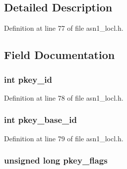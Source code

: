 \subsection{Detailed Description}


Definition at line 77 of file asn1\+\_\+locl.\+h.



\subsection{Field Documentation}
\subsubsection[{\texorpdfstring{pkey\+\_\+id}{pkey_id}}]{\setlength{\rightskip}{0pt plus 5cm}int pkey\+\_\+id}\hypertarget{structevp__pkey__asn1__method__st_a1021097b3af14d7ae24a3756def116d2}{}\label{structevp__pkey__asn1__method__st_a1021097b3af14d7ae24a3756def116d2}


Definition at line 78 of file asn1\+\_\+locl.\+h.

\subsubsection[{\texorpdfstring{pkey\+\_\+base\+\_\+id}{pkey_base_id}}]{\setlength{\rightskip}{0pt plus 5cm}int pkey\+\_\+base\+\_\+id}\hypertarget{structevp__pkey__asn1__method__st_aea38ea93ebe785c0db560b617daee72a}{}\label{structevp__pkey__asn1__method__st_aea38ea93ebe785c0db560b617daee72a}


Definition at line 79 of file asn1\+\_\+locl.\+h.

\subsubsection[{\texorpdfstring{pkey\+\_\+flags}{pkey_flags}}]{\setlength{\rightskip}{0pt plus 5cm}unsigned long pkey\+\_\+flags}\hypertarget{structevp__pkey__asn1__method__st_a307b7d4a21c2c8f905a80603cfc75093}{}\label{structevp__pkey__asn1__method__st_a307b7d4a21c2c8f905a80603cfc75093}


